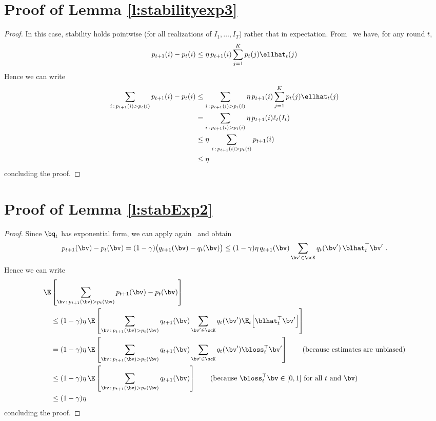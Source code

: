 \section{Proof of Lemma \ref{l:stabilityexp3}}
\begin{proof}
In this case, stability holds pointwise (for all realizations of $I_1,\dots,I_T$) rather that in expectation. From~\cite[Lemma 1]{cgmm16} we have, for any round $t$,
\[
	p_{t+1}(i) - p_t(i) \leq \eta\,p_{t+1}(i) \sum_{j=1}^K p_t(j) \ellhat_t(j)
\]
%
Hence we can write
%
\begin{align*}
\sum_{i\,:\,p_{t+1}(i) > p_t(i)} p_{t+1}(i)-p_t(i)
&\leq
\sum_{i\,:\,p_{t+1}(i) > p_t(i)} \eta\,p_{t+1}(i) \sum_{j=1}^K p_t(j) \ellhat_t(j)\\
&=
\sum_{i\,:\,p_{t+1}(i) > p_t(i)} \eta\,p_{t+1}(i) \ell_t(I_t)\\
&\leq
\eta\,\sum_{i\,:\,p_{t+1}(i) > p_t(i)} p_{t+1}(i)\\
&\leq
\eta
\end{align*}
concluding the proof.
\end{proof}



\section{Proof of Lemma \ref{l:stabExp2}}
%
\begin{proof}
Since $\bq_t$ has exponential form, we can apply again~\cite[Lemma 1]{cgmm16} and obtain
\[
	p_{t+1}(\bv) - p_t(\bv)
=
	(1-\gamma)\big(q_{t+1}(\bv) - q_t(\bv)\big)
\le
	(1-\gamma)\eta\,q_{t+1}(\bv) \sum_{\bv'\in\scK} q_t(\bv')\,\blhat_t^{\top}\bv'~.
\]
%
Hence we can write
%
\begin{align*}
	\E&\left[\sum_{\bv \,:\, p_{t+1}(\bv) > p_t(\bv)} p_{t+1}(\bv) - p_t(\bv) \right]
\\&\le
	(1-\gamma)\eta\,\E\left[\sum_{\bv \,:\, p_{t+1}(\bv) > p_t(\bv)} q_{t+1}(\bv) \sum_{\bv'\in\scK} q_t(\bv') \E_t\Big[\blhat_t^{\top}\bv'\Big] \right]
\\&=
	(1-\gamma)\eta\,\E\left[\sum_{\bv \,:\, p_{t+1}(\bv) > p_t(\bv)} q_{t+1}(\bv) \sum_{\bv'\in\scK} q_t(\bv') \bloss_t^{\top}\bv' \right]
	\tag{because estimates are unbiased}
\\&\le
	(1-\gamma)\eta\,\E\left[\sum_{\bv \,:\, p_{t+1}(\bv) > p_t(\bv)} q_{t+1}(\bv) \right]
	\tag{because $\bloss_t^{\top}\bv \in [0,1]$ for all $t$ and $\bv$}
\\&\le
	(1-\gamma)\eta
\end{align*}
concluding the proof.
\end{proof}



